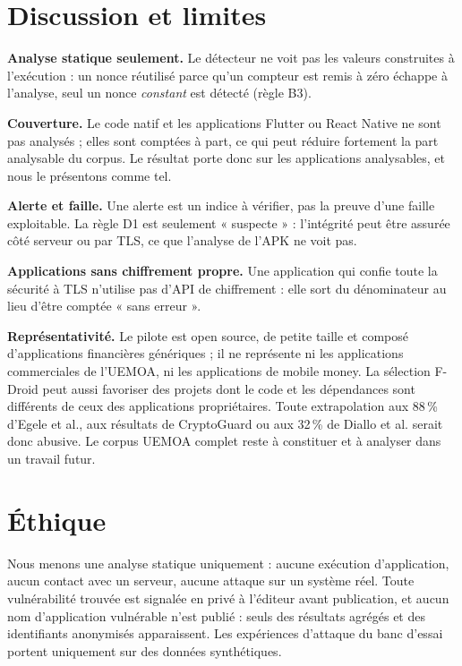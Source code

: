 \documentclass[conference,a4paper]{IEEEtran}
\begin{document}
\section{Discussion et limites}

\textbf{Analyse statique seulement.} Le détecteur ne voit pas les valeurs construites à l'exécution : un nonce réutilisé parce qu'un compteur est remis à zéro échappe à l'analyse, seul un nonce \emph{constant} est détecté (règle B3).

\textbf{Couverture.} Le code natif et les applications Flutter ou React Native ne sont pas analysés ; elles sont comptées à part, ce qui peut réduire fortement la part analysable du corpus. Le résultat porte donc sur les applications analysables, et nous le présentons comme tel.

\textbf{Alerte et faille.} Une alerte est un indice à vérifier, pas la preuve d'une faille exploitable. La règle D1 est seulement « suspecte » : l'intégrité peut être assurée côté serveur ou par TLS, ce que l'analyse de l'APK ne voit pas.

\textbf{Applications sans chiffrement propre.} Une application qui confie toute la sécurité à TLS n'utilise pas d'API de chiffrement : elle sort du dénominateur au lieu d'être comptée « sans erreur ».

\textbf{Représentativité.} Le pilote est open source, de petite taille et composé d'applications financières génériques ; il ne représente ni les applications commerciales de l'UEMOA, ni les applications de mobile money. La sélection F-Droid peut aussi favoriser des projets dont le code et les dépendances sont différents de ceux des applications propriétaires. Toute extrapolation aux 88\,\% d'Egele et al., aux résultats de CryptoGuard ou aux 32\,\% de Diallo et al. serait donc abusive. Le corpus UEMOA complet reste à constituer et à analyser dans un travail futur.

\section{Éthique}
Nous menons une analyse statique uniquement : aucune exécution d'application, aucun contact avec un serveur, aucune attaque sur un système réel. Toute vulnérabilité trouvée est signalée en privé à l'éditeur avant publication, et aucun nom d'application vulnérable n'est publié : seuls des résultats agrégés et des identifiants anonymisés apparaissent. Les expériences d'attaque du banc d'essai portent uniquement sur des données synthétiques.
\end{document}
